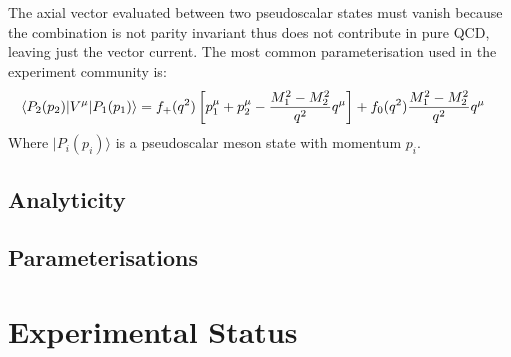 \\ \\
The axial vector evaluated between two pseudoscalar states must vanish because the combination is not parity invariant thus does not contribute in pure QCD, leaving just the vector current. The most common parameterisation used in the experiment community is:
\begin{align}
\label{eq:formfactors}
\langle P_2 (p_2) | V^{\mu} | P_1 (p_1) \rangle  &= f_{+} (q^2) \left[ p_1^{\mu} + p_2^{\mu} - {M_1^2 - M_2^2 \over q^2} q^{\mu} \right] + f_0(q^2) {M_1^2 - M_2^2 \over q^2 } q^{\mu}
\end{align}
Where $|P_i(p_i)\rangle$ is a pseudoscalar meson state with momentum $p_i$.

\subsection{Analyticity}

{}

\subsection{Parameterisations}
\label{sec:formfactor_params}

{}


\section{Experimental Status}

{}
